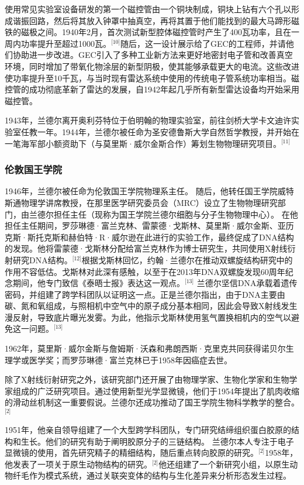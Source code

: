 使用常见实验室设备研发的第一个磁控管由一个铜块制成，铜块上钻有六个孔以形成谐振回路，然后将其放入钟罩中抽真空，再将其置于他们能找到的最大马蹄形磁铁的磁极之间。1940年2月，首次测试新型腔体磁控管时产生了400瓦功率，且在一周内功率提升至超过1000瓦。\(^\text{[10]}\)随后，这一设计展示给了GEC的工程师，并请他们协助进一步改进。GEC引入了多种工业新方法来更好地密封电子管和改善真空环境，同时增加了带氧化物涂层的新型阴极，使其能够承载更大的电流。这些改进使功率提升至10千瓦，与当时现有雷达系统中使用的传统电子管系统功率相当。磁控管的成功彻底革新了雷达的发展，自1942年起几乎所有新型雷达设备均开始采用磁控管。

1943年，兰德尔离开奥利芬特位于伯明翰的物理实验室，前往剑桥大学卡文迪许实验室任教一年。1944年，兰德尔被任命为圣安德鲁斯大学自然哲学教授，并开始在一笔海军部小额资助下（与莫里斯·威尔金斯合作）筹划生物物理研究项目。\(^\text{[11]}\)
\subsubsection{伦敦国王学院}
1946年，兰德尔被任命为伦敦国王学院物理系主任。 随后，他转任国王学院威特斯通物理学讲席教授，在那里医学研究委员会（MRC）设立了生物物理研究部门，由兰德尔担任主任（现称为国王学院兰德尔细胞与分子生物物理中心）。 在他担任主任期间，罗莎琳德·富兰克林、雷蒙德·戈斯林、莫里斯·威尔金斯、亚历克斯·斯托克斯和赫伯特·R·威尔逊在此进行的实验工作，最终促成了DNA结构的发现。他将雷蒙德·戈斯林分配给富兰克林作为博士研究生，共同使用X射线衍射研究DNA结构。\(^\text{[12]}\)根据戈斯林回忆，约翰·兰德尔在推动双螺旋结构研究中的作用不容低估。戈斯林对此深有感触，以至于在2013年DNA双螺旋发现60周年纪念期间，他专门致信《泰晤士报》表达这一观点。\(^\text{[13]}\) 兰德尔坚信DNA承载着遗传密码，并组建了跨学科团队以证明这一点。正是兰德尔指出，由于DNA主要由碳、氮和氧组成，与照相机中空气中的原子成分基本相同，因此会导致X射线发生漫反射，导致底片曝光发雾。为此，他指示戈斯林使用氢气置换相机内的空气以避免这一问题。\(^\text{[13]}\)

1962年，莫里斯·威尔金斯与詹姆斯·沃森和弗朗西斯·克里克共同获得诺贝尔生理学或医学奖；而罗莎琳德·富兰克林已于1958年因癌症去世。

除了X射线衍射研究之外，该研究部门还开展了由物理学家、生物化学家和生物学家组成的广泛研究项目。通过使用新型光学显微镜，他们于1954年提出了肌肉收缩的滑动丝机制这一重要假说。兰德尔还成功推动了国王学院生物科学教学的整合。\(^\text{[2]}\)

1951年，他亲自领导组建了一个大型跨学科团队，专门研究结缔组织蛋白胶原的结构和生长。他们的研究有助于阐明胶原分子的三链结构。 兰德尔本人专注于电子显微镜的使用，首先研究精子的精细结构，随后重点转向胶原的研究。\(^\text{[2]}\)1958年，他发表了一项关于原生动物结构的研究。\(^\text{[2]}\)他还组建了一个新研究小组，以原生动物纤毛作为模式系统，通过关联突变体的结构与生化差异来分析形态发生过程。
